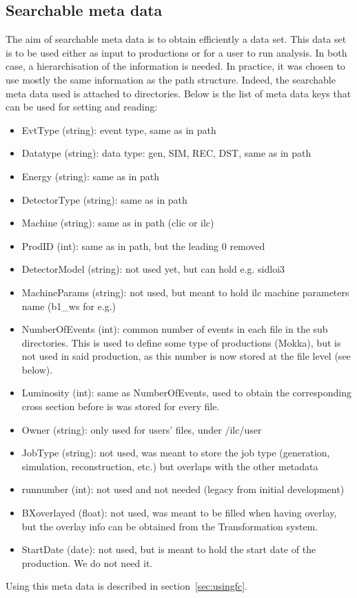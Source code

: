 \documentclass[a4paper,12pt]{article}
\begin{document}
\subsection{Searchable meta data}
The aim of searchable meta data is to obtain efficiently a data set. This data
set is to be used either as input to productions or for a user to run analysis.
In both case, a hierarchisation of the information is needed. In practice, it
was chosen to use mostly the same information as the path structure. Indeed, the
searchable meta data used is attached to directories. Below is the list of meta
data keys that can be used for setting and reading:
\begin{itemize}
  \item EvtType (string): event type, same as in path
  \item Datatype (string): data type: gen, SIM, REC, DST, same as in path
  \item Energy (string): same as in path
  \item DetectorType (string): same as in path
  \item Machine (string): same as in path (clic or ilc)
  \item ProdID (int): same as in path, but the leading 0 removed
  \item DetectorModel (string): not used yet, but can hold e.g. sidloi3 
  \item MachineParams (string): not used, but meant to hold ilc machine
  parameters name (b1\_ws for e.g.)
  \item NumberOfEvents (int): common number of events in each file in the sub
  directories. This is used to define some type of productions (Mokka), but is
  not used in said production, as this number is now stored at the file level
  (see below).
  \item Luminosity (int): same as NumberOfEvents, used to obtain the
  corresponding cross section before is was stored for every file.
  \item Owner (string): only used for users' files, under /ilc/user
  \item JobType (string): not used, was meant to store the job type
  (generation, simulation, reconstruction, etc.) but overlaps with the other
  metadata
  \item runnumber (int): not used and not needed (legacy from initial
  development)
  \item BXoverlayed (float): not used, was meant to be filled when having
  overlay, but the overlay info can be obtained from the Transformation system. 
  \item StartDate (date): not used, but is meant to hold the start date of the
  production. We do not need it.
\end{itemize}
Using this meta data is described in section~\ref{sec:usingfc}.
\end{document}
